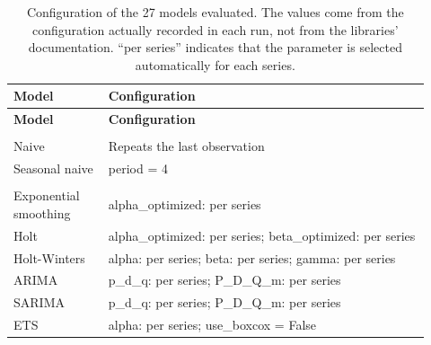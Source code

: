 %
\begin{longtable}{>{\raggedright\arraybackslash}p{0.21\linewidth}>{\raggedright\arraybackslash}p{0.71\linewidth}}
\caption{Configuration of the 27 models evaluated. The values come from the configuration actually recorded in each run, not from the libraries' documentation. ``per series'' indicates that the parameter is selected automatically for each series.}\label{tab:hiperparametros}\\
\toprule
\textbf{Model} & \textbf{Configuration} \\
\midrule
\endfirsthead
\toprule
\textbf{Model} & \textbf{Configuration} \\
\midrule
\endhead
\bottomrule
\endfoot
\multicolumn{2}{l}{\textit{Benchmark}} \\[1mm]
\hspace{.6em}Naive & Repeats the last observation \\
\hspace{.6em}Seasonal naive & period = 4 \\
\addlinespace
\multicolumn{2}{l}{\textit{Statistical}} \\[1mm]
\hspace{.6em}Exponential smoothing & alpha\_optimized: per series \\
\hspace{.6em}Holt & alpha\_optimized: per series; beta\_optimized: per series \\
\hspace{.6em}Holt-Winters & alpha: per series; beta: per series; gamma: per series \\
\hspace{.6em}ARIMA & p\_d\_q: per series; P\_D\_Q\_m: per series \\
\hspace{.6em}SARIMA & p\_d\_q: per series; P\_D\_Q\_m: per series \\
\hspace{.6em}ETS & alpha: per series; use\_boxcox = False \\

\end{longtable}
